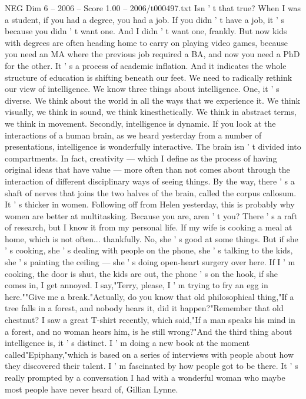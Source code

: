 \begin{textsample}{NEG Dim 6 – 2006 – Score 1.00 – 2006/t000497.txt}
Isn ' t that true?
When I was a student, if you had a degree, you had a job.
If you didn ' t have a job, it ' s because you didn ' t want one.
And I didn ' t want one, frankly.
But now kids with degrees are often heading home to carry on playing video games, because you need an MA where the previous job required a BA, and now you need a PhD for the other.
It ' s a process of academic inflation.
And it indicates the whole structure of education is shifting beneath our feet.
We need to radically rethink our view of intelligence.
We know three things about intelligence.
One, it ' s diverse.
We think about the world in all the ways that we experience it.
We think visually, we think in sound, we think kinesthetically.
We think in abstract terms, we think in movement.
Secondly, intelligence is dynamic.
If you look at the interactions of a human brain, as we heard yesterday from a number of presentations, intelligence is wonderfully interactive.
The brain isn ' t divided into compartments.
In fact, creativity — which I define as the process of having original ideas that have value — more often than not comes about through the interaction of different disciplinary ways of seeing things.
By the way, there ' s a shaft of nerves that joins the two halves of the brain, called the corpus callosum.
It ' s thicker in women.
Following off from Helen yesterday, this is probably why women are better at multitasking.
Because you are, aren ' t you?
There ' s a raft of research, but I know it from my personal life.
If my wife is cooking a meal at home, which is not often... thankfully.
No, she ' s good at some things.
But if she ' s cooking, she ' s dealing with people on the phone, she ' s talking to the kids, she ' s painting the ceiling — she ' s doing open-heart surgery over here.
If I ' m cooking, the door is shut, the kids are out, the phone ' s on the hook, if she comes in, I get annoyed.
I say,"Terry, please, I ' m trying to fry an egg in here.""Give me a break."Actually, do you know that old philosophical thing,"If a tree falls in a forest, and nobody hears it, did it happen?"Remember that old chestnut?
I saw a great T-shirt recently, which said,"If a man speaks his mind in a forest, and no woman hears him, is he still wrong?"And the third thing about intelligence is, it ' s distinct.
I ' m doing a new book at the moment called"Epiphany,"which is based on a series of interviews with people about how they discovered their talent.
I ' m fascinated by how people got to be there.
It ' s really prompted by a conversation I had with a wonderful woman who maybe most people have never heard of, Gillian Lynne.

\end{textsample}
